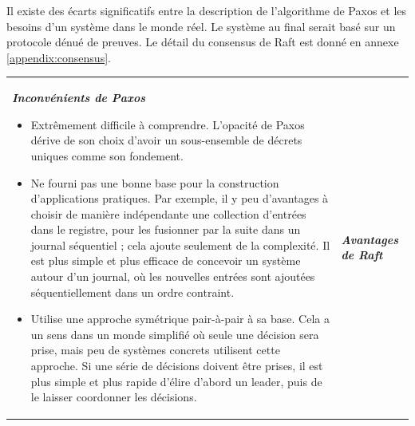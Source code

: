 Il existe des écarts significatifs entre la description de l'algorithme de Paxos
et les besoins d'un système dans le monde réel. Le système au final serait basé
sur un protocole dénué de preuves. Le détail du consensus de Raft est donné en
annexe \ref{appendix:consensus}.

\begin{table}
    \begin{tabular}{p{}p{}}
        \noindent
        \textbf{\textit{Inconvénients de Paxos}}
    
        \begin{itemize}
            \item Extrêmement difficile à comprendre. L'opacité de Paxos dérive
                de son choix d'avoir un sous-ensemble de décrets uniques comme
                son fondement.
            \item Ne fourni pas une bonne base pour la construction
                d'applications pratiques. Par exemple, il y peu d'avantages à
                choisir de manière indépendante une collection d'entrées dans le
                registre, pour les fusionner par la suite dans un journal
                séquentiel ; cela ajoute seulement de la complexité. Il est plus
                simple et plus efficace de concevoir un système autour d'un
                journal, où les nouvelles entrées sont ajoutées séquentiellement
                dans un ordre contraint.
            \item Utilise une approche symétrique pair-à-pair à sa base. Cela a
                un sens dans un monde simplifié où seule une décision sera
                prise, mais peu de systèmes concrets utilisent cette approche.
                Si une série de décisions doivent être prises, il est plus
                simple et plus rapide d'élire d'abord un leader, puis de le
                laisser coordonner les décisions.
        \end{itemize} 
        
        &
    
        \textbf{\textit{Avantages de Raft}}
    

\end{tabular}
\end{table}
